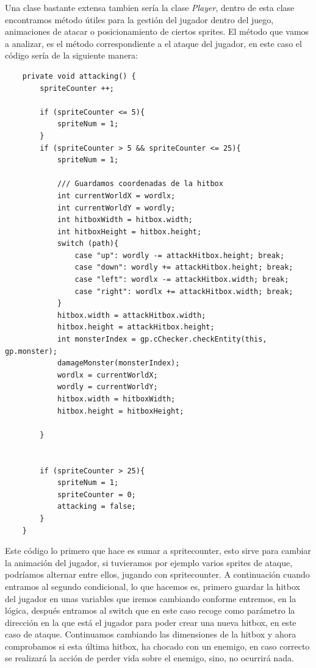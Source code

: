 \documentclass[a4paper]{article}
\begin{document}
Una clase bastante extensa tambien sería la clase \textit{Player}, dentro de esta clase encontramos método útiles para la gestión del jugador dentro del juego, animaciones de atacar o posicionamiento de ciertos sprites. El método que vamos a analizar, es el método correspondiente a
el ataque del jugador, en este caso el código sería de la siguiente manera:
\begin{lstlisting}
    private void attacking() {
        spriteCounter ++;

        if (spriteCounter <= 5){
            spriteNum = 1;
        }
        if (spriteCounter > 5 && spriteCounter <= 25){
            spriteNum = 1;

            /// Guardamos coordenadas de la hitbox
            int currentWorldX = wordlx;
            int currentWorldY = wordly;
            int hitboxWidth = hitbox.width;
            int hitboxHeight = hitbox.height;
            switch (path){
                case "up": wordly -= attackHitbox.height; break;
                case "down": wordly += attackHitbox.height; break;
                case "left": wordlx -= attackHitbox.width; break;
                case "right": wordlx += attackHitbox.width; break;
            }
            hitbox.width = attackHitbox.width;
            hitbox.height = attackHitbox.height;
            int monsterIndex = gp.cChecker.checkEntity(this, gp.monster);
            damageMonster(monsterIndex);
            wordlx = currentWorldX;
            wordly = currentWorldY;
            hitbox.width = hitboxWidth;
            hitbox.height = hitboxHeight;

        }


        if (spriteCounter > 25){
            spriteNum = 1;
            spriteCounter = 0;
            attacking = false;
        }
    }
\end{lstlisting}
Este código lo primero que hace es sumar a spritecounter, esto sirve para cambiar la animación del jugador, si tuvieramos por ejemplo varios sprites de ataque, podríamos alternar entre ellos,
jugando con spritecounter. A continuación cuando entramos al segundo condicional, lo que hacemos es, primero guardar la hitbox del jugador en unas variables que iremos cambiando conforme entremos,
en la lógica, después entramos al switch que en este caso recoge como parámetro la dirección en la que está el jugador para poder crear una nueva hitbox, en este caso de ataque.
Continuamos cambiando las dimensiones de la hitbox y ahora comprobamos si esta última hitbox, ha chocado con un enemigo, en caso correcto se realizará la acción de perder vida sobre el enemigo, sino, no ocurrirá nada.
\end{document}
